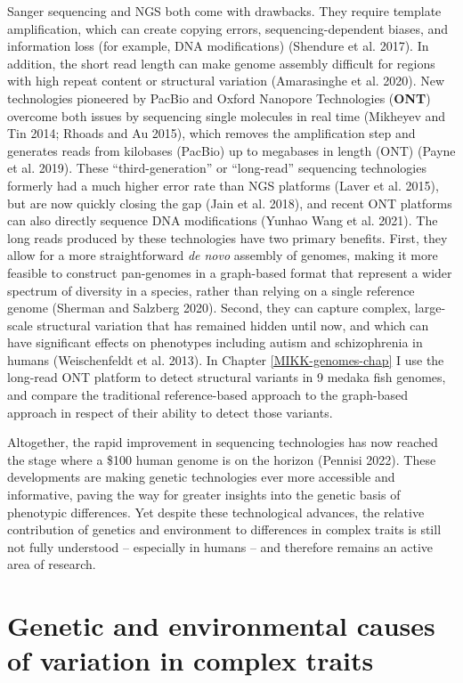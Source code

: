 \documentclass[
]{book}
\begin{document}
Sanger sequencing and NGS both come with drawbacks. They require template amplification, which can create copying errors, sequencing-dependent biases, and information loss (for example, DNA modifications) (Shendure et al. 2017). In addition, the short read length can make genome assembly difficult for regions with high repeat content or structural variation (Amarasinghe et al. 2020). New technologies pioneered by PacBio and Oxford Nanopore Technologies (\textbf{ONT}) overcome both issues by sequencing single molecules in real time (Mikheyev and Tin 2014; Rhoads and Au 2015), which removes the amplification step and generates reads from kilobases (PacBio) up to megabases in length (ONT) (Payne et al. 2019). These ``third-generation'' or ``long-read'' sequencing technologies formerly had a much higher error rate than NGS platforms (Laver et al. 2015), but are now quickly closing the gap (Jain et al. 2018), and recent ONT platforms can also directly sequence DNA modifications (Yunhao Wang et al. 2021). The long reads produced by these technologies have two primary benefits. First, they allow for a more straightforward \emph{de novo} assembly of genomes, making it more feasible to construct pan-genomes in a graph-based format that represent a wider spectrum of diversity in a species, rather than relying on a single reference genome (Sherman and Salzberg 2020). Second, they can capture complex, large-scale structural variation that has remained hidden until now, and which can have significant effects on phenotypes including autism and schizophrenia in humans (Weischenfeldt et al. 2013). In Chapter \ref{MIKK-genomes-chap} I use the long-read ONT platform to detect structural variants in 9 medaka fish genomes, and compare the traditional reference-based approach to the graph-based approach in respect of their ability to detect those variants.

Altogether, the rapid improvement in sequencing technologies has now reached the stage where a \$100 human genome is on the horizon (Pennisi 2022). These developments are making genetic technologies ever more accessible and informative, paving the way for greater insights into the genetic basis of phenotypic differences. Yet despite these technological advances, the relative contribution of genetics and environment to differences in complex traits is still not fully understood -- especially in humans -- and therefore remains an active area of research.

\hypertarget{genetic-and-environmental-causes-of-variation-in-complex-traits}{%
\section{Genetic and environmental causes of variation in complex traits}\label{genetic-and-environmental-causes-of-variation-in-complex-traits}}
\end{document}
